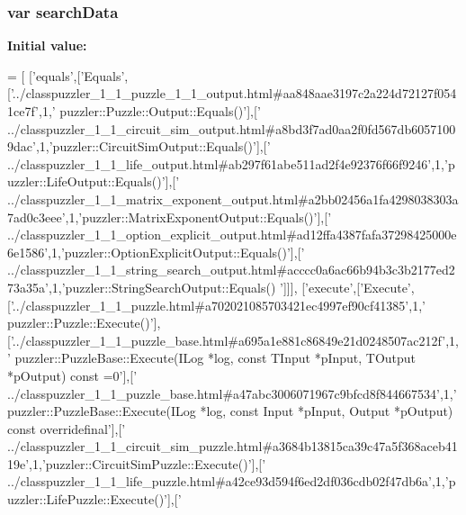 \subsubsection[{search\+Data}]{\setlength{\rightskip}{0pt plus 5cm}var search\+Data}\label{a00085_ad01a7523f103d6242ef9b0451861231e}
{\bfseries Initial value\+:}
\begin{DoxyCode}
=
[
  [\textcolor{stringliteral}{'equals'},[\textcolor{stringliteral}{'Equals'},[\textcolor{stringliteral}{'../classpuzzler\_1\_1\_puzzle\_1\_1\_output.html#aa848aae3197c2a224d72127f0541ce7f'},1,\textcolor{stringliteral}{'
      puzzler::Puzzle::Output::Equals()'}],[\textcolor{stringliteral}{'
      ../classpuzzler\_1\_1\_circuit\_sim\_output.html#a8bd3f7ad0aa2f0fd567db60571009dac'},1,\textcolor{stringliteral}{'puzzler::CircuitSimOutput::Equals()'}],[\textcolor{stringliteral}{'
      ../classpuzzler\_1\_1\_life\_output.html#ab297f61abe511ad2f4e92376f66f9246'},1,\textcolor{stringliteral}{'puzzler::LifeOutput::Equals()'}],[\textcolor{stringliteral}{'
      ../classpuzzler\_1\_1\_matrix\_exponent\_output.html#a2bb02456a1fa4298038303a7ad0c3eee'},1,\textcolor{stringliteral}{'puzzler::MatrixExponentOutput::Equals()'}],[\textcolor{stringliteral}{'
      ../classpuzzler\_1\_1\_option\_explicit\_output.html#ad12ffa4387fafa37298425000e6e1586'},1,\textcolor{stringliteral}{'puzzler::OptionExplicitOutput::Equals()'}],[\textcolor{stringliteral}{'
      ../classpuzzler\_1\_1\_string\_search\_output.html#acccc0a6ac66b94b3c3b2177ed273a35a'},1,\textcolor{stringliteral}{'puzzler::StringSearchOutput::Equals()
      '}]]],
  [\textcolor{stringliteral}{'execute'},[\textcolor{stringliteral}{'Execute'},[\textcolor{stringliteral}{'../classpuzzler\_1\_1\_puzzle.html#a702021085703421ec4997ef90cf41385'},1,\textcolor{stringliteral}{'
      puzzler::Puzzle::Execute()'}],[\textcolor{stringliteral}{'../classpuzzler\_1\_1\_puzzle\_base.html#a695a1e881c86849e21d0248507ac212f'},1,\textcolor{stringliteral}{'
      puzzler::PuzzleBase::Execute(ILog *log, const TInput *pInput, TOutput *pOutput) const =0'}],[\textcolor{stringliteral}{'
      ../classpuzzler\_1\_1\_puzzle\_base.html#a47abc3006071967c9bfcd8f844667534'},1,\textcolor{stringliteral}{'puzzler::PuzzleBase::Execute(ILog *log, const Input *pInput,
       Output *pOutput) const overridefinal'}],[\textcolor{stringliteral}{'
      ../classpuzzler\_1\_1\_circuit\_sim\_puzzle.html#a3684b13815ca39c47a5f368aceb4119e'},1,\textcolor{stringliteral}{'puzzler::CircuitSimPuzzle::Execute()'}],[\textcolor{stringliteral}{'
      ../classpuzzler\_1\_1\_life\_puzzle.html#a42ce93d594f6ed2df036cdb02f47db6a'},1,\textcolor{stringliteral}{'puzzler::LifePuzzle::Execute()'}],[\textcolor{stringliteral}{'
}
\end{DoxyCode}

